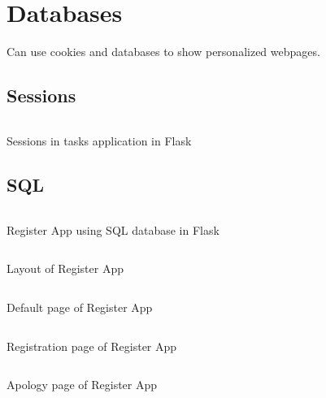 \chapter{Databases}
Can use cookies and databases to show personalized webpages.

\section{Sessions}
\begin{code}
	\inputminted{python}{codes/web/databases/tasks/application.py}
	\caption{Sessions in tasks application in Flask}
\end{code}

\section{SQL}
\begin{code}
	\inputminted{python}{codes/web/databases/register/application.py}
	\caption{Register App using SQL database in Flask}
\end{code}
\begin{code}
	\inputminted{html}{codes/web/databases/register/templates/layout.html}
	\caption{Layout of Register App}
\end{code}
\begin{code}
	\inputminted{html}{codes/web/databases/register/templates/index.html}
	\caption{Default page of Register App}
\end{code}
\clearpage
\begin{code}
	\inputminted{html}{codes/web/databases/register/templates/register.html}
	\caption{Registration page of Register App}
\end{code}
\begin{code}
	\inputminted{html}{codes/web/databases/register/templates/apology.html}
	\caption{Apology page of Register App}
\end{code}